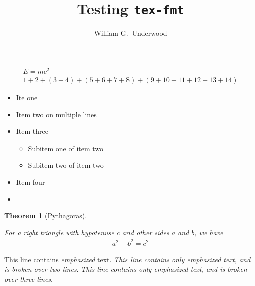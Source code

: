 \documentclass{article}
\title{Testing \texttt{tex-fmt}}
\author{William G.\ Underwood}
\newtheorem{theorem}{Theorem}
\begin{document}
\maketitle

\begin{align}
E = m c^2 \\
1 + 2
+ (3 + 4)
+ (5 + 6
+ 7 + 8)
+ (9 + 10
+ 11 + 12
+ 13 + 14)
\end{align}

\begin{itemize}
\item Ite one %
\item Item two on
multiple lines
\item Item three
\begin{itemize}
\item Subitem one of item two
\item Subitem two of item two
\end{itemize}
\item Item four %
\item
\end{itemize}

\begin{theorem}[Pythagoras]%
\label{thm:pythagoras}

For a right triangle with hypotenuse $c$ and other sides $a$ and $b$,
we have
%
\begin{align*}
a^2 + b^2 = c^2
\end{align*}
%

\end{theorem}

This line contains \emph{emphasized} text.
\emph{This line contains only emphasized text,
and is broken over two lines}.
\emph{This line contains only
emphasized text,
and is broken over three lines}.
\end{document}
